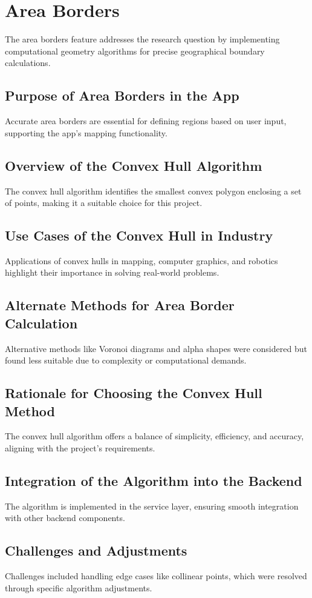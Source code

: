\Author{\daAuthorThree}

    \section{Area Borders}
    The area borders feature addresses the research question by implementing computational geometry algorithms for precise geographical boundary calculations.

    \subsection{Purpose of Area Borders in the App}
    Accurate area borders are essential for defining regions based on user input, supporting the app's mapping functionality.

    \subsection{Overview of the Convex Hull Algorithm}
    The convex hull algorithm identifies the smallest convex polygon enclosing a set of points, making it a suitable choice for this project.

    \subsection{Use Cases of the Convex Hull in Industry}
    Applications of convex hulls in mapping, computer graphics, and robotics highlight their importance in solving real-world problems.

    \subsection{Alternate Methods for Area Border Calculation}
    Alternative methods like Voronoi diagrams and alpha shapes were considered but found less suitable due to complexity or computational demands.

    \subsection{Rationale for Choosing the Convex Hull Method}
    The convex hull algorithm offers a balance of simplicity, efficiency, and accuracy, aligning with the project's requirements.

    \subsection{Integration of the Algorithm into the Backend}
    The algorithm is implemented in the service layer, ensuring smooth integration with other backend components.

    \subsection{Challenges and Adjustments}
    Challenges included handling edge cases like collinear points, which were resolved through specific algorithm adjustments.

